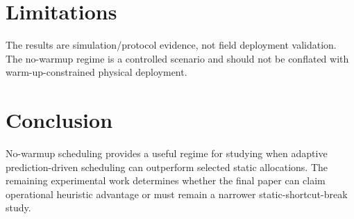 \documentclass[11pt]{article}
\begin{document}
\section{Limitations}

The results are simulation/protocol evidence, not field deployment validation.
The no-warmup regime is a controlled scenario and should not be conflated with
warm-up-constrained physical deployment.

\section{Conclusion}

No-warmup scheduling provides a useful regime for studying when adaptive
prediction-driven scheduling can outperform selected static allocations. The
remaining experimental work determines whether the final paper can claim
operational heuristic advantage or must remain a narrower static-shortcut-break
study.



\end{document}
